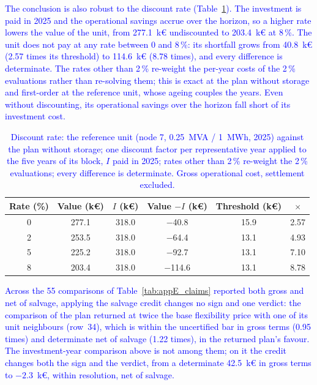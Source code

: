 \documentclass[preprint,12pt]{elsarticle}
\begin{document}
\textcolor{blue}{
    The conclusion is also robust to the discount rate (Table~\ref{tab:res_discount}). The investment is paid in 2025 and the operational savings accrue over the horizon, so a higher rate lowers the value of the unit, from 277.1~k\euro{} undiscounted to 203.4~k\euro{} at 8\,\%. The unit does not pay at any rate between 0 and 8\,\%: its shortfall grows from 40.8~k\euro{} (2.57 times its threshold) to 114.6~k\euro{} (8.78 times), and every difference is determinate. 
    The rates other than 2\,\% re-weight the per-year costs of the 2\,\% evaluations rather than re-solving them; this is exact at the plan without storage and first-order at the reference unit, whose ageing couples the years.
    Even without discounting, its operational savings over the horizon fall short of its investment cost.
}

\begin{table}[htbp!]
    \centering
    \caption{\textcolor{blue}{Discount rate: the reference unit (node 7, 0.25~MVA / 1~MWh, 2025) against the plan without storage; one discount factor per representative year applied to the five years of its block, $I$ paid in 2025; rates other than 2\,\% re-weight the 2\,\% evaluations; every difference is determinate. Gross operational cost, settlement excluded.}}
    \label{tab:res_discount}
    \scriptsize\setlength{\tabcolsep}{5pt}
    \begin{tabular}{c c c c c c}
        \toprule
        Rate (\%) & Value (k\euro) & $I$ (k\euro) & Value $- I$ (k\euro) & Threshold (k\euro) & $\times$ \\
        \midrule
        0 & 277.1 & 318.0 & $-$40.8  & 15.9 & 2.57 \\
        2 & 253.5 & 318.0 & $-$64.4  & 13.1 & 4.93 \\
        5 & 225.2 & 318.0 & $-$92.7  & 13.1 & 7.10 \\
        8 & 203.4 & 318.0 & $-$114.6 & 13.1 & 8.78 \\
        \bottomrule
    \end{tabular}
\end{table}

\textcolor{blue}{
    Across the 55 comparisons of Table~\ref{tab:appE_claims} reported both gross and net of salvage, applying the salvage credit changes no sign and one verdict: the comparison of the plan returned at twice the base flexibility price with one of its unit neighbours (row~34), which is within the uncertified bar in gross terms (0.95 times) and determinate net of salvage (1.22 times), in the returned plan's favour. The investment-year comparison above is not among them; on it the credit changes both the sign and the verdict, from a determinate 42.5~k\euro{} in gross terms to $-2.3$~k\euro{}, within resolution, net of salvage.
}
\end{document}
